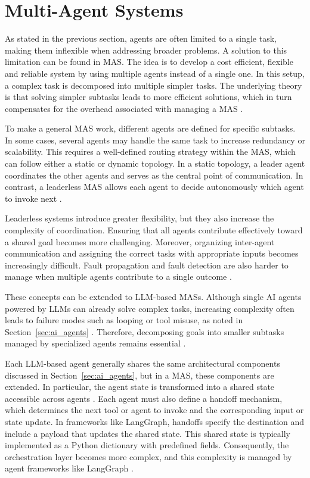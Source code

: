 \documentclass[a4paper,oneside,bibliography=totoc]{scrbook}
\begin{document}
\section{Multi-Agent Systems}
\label{sec:multi_agent_systems}

As stated in the previous section, agents are often limited to a single task, making them inflexible when addressing broader problems. A solution to this limitation can be found in \ac{MAS}. The idea is to develop a cost efficient, flexible and reliable system by using multiple agents instead of a single one. In this setup, a complex task is decomposed into multiple simpler tasks. The underlying theory is that solving simpler subtasks leads to more efficient solutions, which in turn compensates for the overhead associated with managing a \ac{MAS} \cite{Dorri2018}.

To make a general \ac{MAS} work, different agents are defined for specific subtasks. In some cases, several agents may handle the same task to increase redundancy or scalability. This requires a well-defined routing strategy within the \ac{MAS}, which can follow either a static or dynamic topology. In a static topology, a leader agent coordinates the other agents and serves as the central point of communication. In contrast, a leaderless \ac{MAS} allows each agent to decide autonomously which agent to invoke next \cite{Dorri2018}.

Leaderless systems introduce greater flexibility, but they also increase the complexity of coordination. Ensuring that all agents contribute effectively toward a shared goal becomes more challenging. Moreover, organizing inter-agent communication and assigning the correct tasks with appropriate inputs becomes increasingly difficult. Fault propagation and fault detection are also harder to manage when multiple agents contribute to a single outcome \cite{Dorri2018}.

These concepts can be extended to \ac{LLM}-based \acp{MAS}. Although single \ac{AI} agents powered by \acp{LLM} can already solve complex tasks, increasing complexity often leads to failure modes such as looping or tool misuse, as noted in Section~\ref{sec:ai_agents} \cite{OpenAI2025}. Therefore, decomposing goals into smaller subtasks managed by specialized agents remains essential \cite{Sapkota2025}.

Each \ac{LLM}-based agent generally shares the same architectural components discussed in Section~\ref{sec:ai_agents}, but in a \ac{MAS}, these components are extended. In particular, the agent state is transformed into a shared state accessible across agents \cite{Sapkota2025}. Each agent must also define a handoff mechanism, which determines the next tool or agent to invoke and the corresponding input or state update. In frameworks like LangGraph, handoffs specify the destination and include a payload that updates the shared state. This shared state is typically implemented as a Python dictionary with predefined fields. Consequently, the orchestration layer becomes more complex, and this complexity is managed by agent frameworks like LangGraph \cite{LangChain2025b}.
\end{document}
